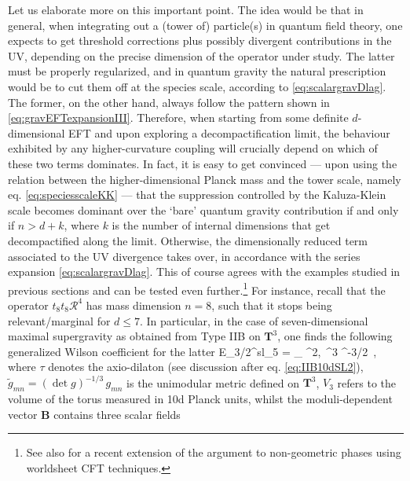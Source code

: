 Let us elaborate more on this important point. The idea would be that in general, when integrating out a (tower of) particle(s) in quantum field theory, one expects to get threshold corrections plus possibly divergent contributions in the UV, depending on the precise dimension of the operator under study. The latter must be properly regularized, and in quantum gravity the natural prescription would be to cut them off at the species scale, according to \eqref{eq:scalargravDlag}. The former, on the other hand, always follow the pattern shown in \eqref{eq:gravEFTexpansionIII}. Therefore, when starting from some definite $d$-dimensional EFT and upon exploring a decompactification limit, the behaviour exhibited by any higher-curvature coupling will crucially depend on which of these two terms dominates. In fact, it is easy to get convinced --- upon using the relation between the higher-dimensional Planck mass and the tower scale, namely eq. \eqref{eq:speciesscaleKK} --- that the suppression controlled by the Kaluza-Klein scale becomes dominant over the `bare' quantum gravity contribution if and only if $n > d+k$, where $k$ is the number of internal dimensions that get decompactified along the limit. Otherwise, the dimensionally reduced term associated to the UV divergence takes over, in accordance with the series expansion \eqref{eq:scalargravDlag}. This of course agrees with the examples studied in previous sections and can be tested even further.\footnote{See also \cite{Aoufia:2024awo} for a recent extension of the argument to non-geometric phases using worldsheet CFT techniques.} For instance, recall that the operator $t_8 t_8 \mathcal{R}^4$ has mass dimension $n=8$, such that it stops being relevant/marginal for $d\leq 7$. In particular, in the case of seven-dimensional maximal supergravity as obtained from Type IIB on $\mathbf{T}^3$, one finds the following generalized Wilson coefficient for the latter \cite{Green:2010wi}
%
\beq\label{eq:R4in7d}
 E_{3/2}^{sl_5} = \sum_{ \in {}^2,\,  \in {}^3} ^{-3/2}\, ,
\eeq
%
where $\tau$ denotes the axio-dilaton (see discussion after eq. \eqref{eq:IIB10dSL2}), $\tilde{g}_{mn}=(\det g)^{-1/3}\, g_{m n}$ is the unimodular metric defined on $\mathbf{T}^3$, $V_3$ refers to the volume of the torus measured in 10d Planck units, whilst the moduli-dependent vector $\mathbf{B}$ contains three scalar fields
